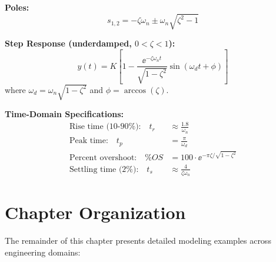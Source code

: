 \textbf{Poles:}
\begin{equation}
s_{1,2} = -\zeta\omega_n \pm \omega_n\sqrt{\zeta^2 - 1}
\end{equation}

\textbf{Step Response (underdamped, $0 < \zeta < 1$):}
\begin{equation}
y(t) = K\left[1 - \frac{\ee^{-\zeta\omega_n t}}{\sqrt{1-\zeta^2}}\sin(\omega_d t + \phi)\right]
\end{equation}
where $\omega_d = \omega_n\sqrt{1-\zeta^2}$ and $\phi = \arccos(\zeta)$.

\textbf{Time-Domain Specifications:}
\begin{align}
\text{Rise time (10-90\%):} \quad t_r &\approx \frac{1.8}{\omega_n} \\
\text{Peak time:} \quad t_p &= \frac{\pi}{\omega_d} \\
\text{Percent overshoot:} \quad \%OS &= 100 \cdot \ee^{-\pi\zeta/\sqrt{1-\zeta^2}} \\
\text{Settling time (2\%):} \quad t_s &\approx \frac{4}{\zeta\omega_n}
\end{align}

\section{Chapter Organization}
\label{sec:chapter_organization}

The remainder of this chapter presents detailed modeling examples across engineering domains:

